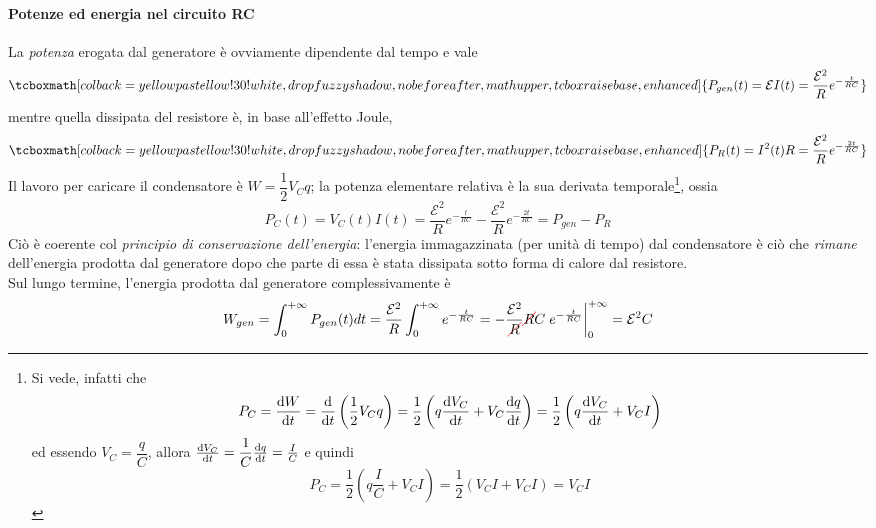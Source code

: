 \paragraph{Potenze ed energia nel circuito RC}
La \textit{potenza} erogata dal generatore è ovviamente dipendente dal tempo e vale
\begin{equation}
	\tcboxmath[colback=yellowpastellow!30!white,drop fuzzy shadow, nobeforeafter, math upper, tcbox raise base, enhanced]{P_{gen}(t)=\mathcal{E}I(t)=\frac{\mathcal{E}^2}{R}e^{-\frac{t}{RC}}}
\end{equation}
mentre quella dissipata del resistore è, in base all'effetto Joule,
\begin{equation}
	\tcboxmath[colback=yellowpastellow!30!white,drop fuzzy shadow, nobeforeafter, math upper, tcbox raise base, enhanced]{P_{R}(t)=I^2(t)R=\frac{\mathcal{E}^2}{R}e^{-\frac{2t}{RC}}}
\end{equation}
Il lavoro per caricare il condensatore è $W=\dfrac{1}{2}V_Cq$; la potenza elementare relativa è la sua derivata temporale\footnote{Si vede, infatti che
\begin{equation*}
	P_{C}=\dv{W}{t}=\dv{t}\left(\frac{1}{2}V_Cq\right)=\frac{1}{2}\left(q\dv{V_C}{t}+V_C\dv{q}{t}\right)=\frac{1}{2}\left(q\dv{V_C}{t}+V_CI\right)
\end{equation*}
ed essendo $V_C=\dfrac{q}{C}$, allora $\dv{V_C}{t}=\dfrac{1}{C}\dv{q}{t}=\frac{I}{C}$ e quindi
\begin{equation*}
	P_{C}=\frac{1}{2}\left(q\frac{I}{C}+V_CI\right)=\frac{1}{2}\left(V_CI+V_CI\right)=V_CI
\end{equation*}}, ossia 
\begin{equation}
	P_{C}(t)=V_C(t)I(t)=\frac{\mathcal{E}^2}{R}e^{-\frac{t}{RC}}-\frac{\mathcal{E}^2}{R}e^{-\frac{2t}{RC}}=P_{gen}-P_{R}
\end{equation}
Ciò è coerente col \textit{principio di conservazione dell'energia}: l'energia immagazzinata (per unità di tempo) dal condensatore è ciò che \textit{rimane} dell'energia prodotta dal generatore dopo che parte di essa è stata dissipata sotto forma di calore dal resistore.\\
Sul lungo termine, l'energia prodotta dal generatore complessivamente è
\begin{equation*}
	W_{gen}=\int_{0}^{+\infty}P_{gen}(t)dt=\frac{\mathcal{E}^2}{R}\int_{0}^{+\infty}e^{-\frac{t}{RC}}=-\frac{\mathcal{E}^2}{\Ccancel[red]{R}}\Ccancel[red]{R}C\eval{e^{-\frac{t}{RC}}}_{0}^{+\infty}=\mathcal{E}^2C
\end{equation*}
